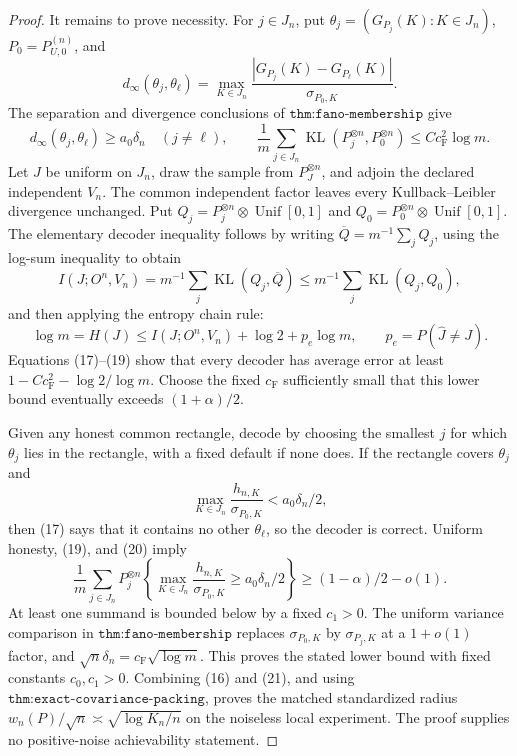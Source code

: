 \documentclass{article}
\begin{document}
\begin{proof}
It remains to prove necessity.  For \(j\in J_n\), put \(\theta_j=(G_{P_j}(K):K\in J_n)\), \(P_0=P_{U,0}^{(n)}\), and
\[
 d_\infty(\theta_j,\theta_\ell)=
 \max_{K\in J_n}\frac{|G_{P_j}(K)-G_{P_\ell}(K)|}{\sigma_{P_0,K}}.
\]
The separation and divergence conclusions of \(\texttt{thm:fano-membership}\) give
\[
 d_\infty(\theta_j,\theta_\ell)\geq a_0\delta_n\quad(j\neq\ell),
 \qquad
 \frac1m\sum_{j\in J_n}\operatorname{KL}(P_j^{\otimes n},P_0^{\otimes n})
 \leq Cc_{\mathrm F}^2\log m.                                               \tag{17}
\]
Let \(J\) be uniform on \(J_n\), draw the sample from \(P_J^{\otimes n}\), and adjoin the declared independent \(V_n\).  The common independent factor leaves every Kullback--Leibler divergence unchanged.  Put \(Q_j=P_j^{\otimes n}\otimes\operatorname{Unif}[0,1]\) and \(Q_0=P_0^{\otimes n}\otimes\operatorname{Unif}[0,1]\).  The elementary decoder inequality follows by writing \(\overline Q=m^{-1}\sum_jQ_j\), using the log-sum inequality to obtain
\[
 I(J;O^n,V_n)=m^{-1}\sum_j\operatorname{KL}(Q_j,\overline Q)
 \leq m^{-1}\sum_j\operatorname{KL}(Q_j,Q_0),                              \tag{18}
\]
and then applying the entropy chain rule:
\[
 \log m=H(J)\leq I(J;O^n,V_n)+\log2+p_e\log m,
 \qquad p_e=P(\widehat J\neq J).                                           \tag{19}
\]
Equations (17)--(19) show that every decoder has average error at least \(1-Cc_{\mathrm F}^2-\log2/\log m\).  Choose the fixed \(c_{\mathrm F}\) sufficiently small that this lower bound eventually exceeds \((1+\alpha)/2\).

Given any honest common rectangle, decode by choosing the smallest \(j\) for which \(\theta_j\) lies in the rectangle, with a fixed default if none does.  If the rectangle covers \(\theta_j\) and
\[
 \max_{K\in J_n}\frac{h_{n,K}}{\sigma_{P_0,K}}<a_0\delta_n/2,              \tag{20}
\]
then (17) says that it contains no other \(\theta_\ell\), so the decoder is correct.  Uniform honesty, (19), and (20) imply
\[
 \frac1m\sum_{j\in J_n}P_j^{\otimes n}\!\left\{
 \max_{K\in J_n}\frac{h_{n,K}}{\sigma_{P_0,K}}
 \geq a_0\delta_n/2\right\}
 \geq(1-\alpha)/2-o(1).                                                      \tag{21}
\]
At least one summand is bounded below by a fixed \(c_1>0\).  The uniform variance comparison in \(\texttt{thm:fano-membership}\) replaces \(\sigma_{P_0,K}\) by \(\sigma_{P_j,K}\) at a \(1+o(1)\) factor, and \(\sqrt n\delta_n=c_{\mathrm F}\sqrt{\log m}\).  This proves the stated lower bound with fixed constants \(c_0,c_1>0\).  Combining (16) and (21), and using \(\texttt{thm:exact-covariance-packing}\), proves the matched standardized radius \(w_n(P)/\sqrt n\asymp\sqrt{\log K_n/n}\) on the noiseless local experiment.  The proof supplies no positive-noise achievability statement.
\end{proof}
\end{document}
